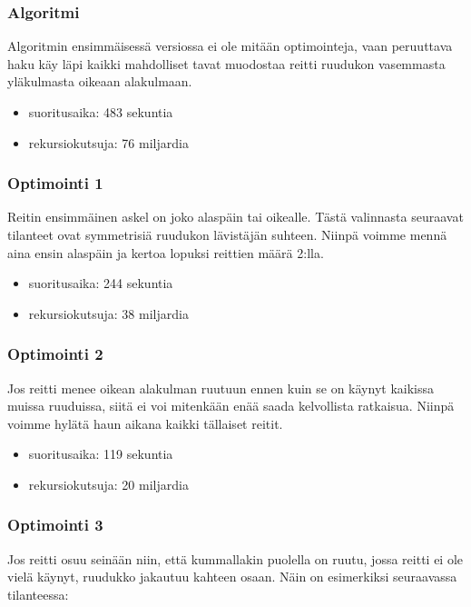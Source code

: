 \subsubsection{Algoritmi}

Algoritmin ensimmäisessä versiossa ei ole mitään optimointeja,
vaan peruuttava haku käy läpi kaikki mahdolliset tavat
muodostaa reitti ruudukon vasemmasta yläkulmasta
oikeaan alakulmaan.

\begin{itemize}
\item
suoritusaika: 483 sekuntia
\item
rekursiokutsuja: 76 miljardia
\end{itemize}

\subsubsection{Optimointi 1}

Reitin ensimmäinen askel on joko alaspäin
tai oikealle. Tästä valinnasta seuraavat tilanteet
ovat symmetrisiä ruudukon lävistäjän suhteen.
Niinpä voimme mennä aina ensin alaspäin
ja kertoa lopuksi reittien määrä 2:lla.

\begin{itemize}
\item
suoritusaika: 244 sekuntia
\item
rekursiokutsuja: 38 miljardia
\end{itemize}

\subsubsection{Optimointi 2}

Jos reitti menee oikean alakulman ruutuun ennen kuin
se on käynyt kaikissa muissa ruuduissa,
siitä ei voi mitenkään enää saada kelvollista ratkaisua.
Niinpä voimme hylätä haun aikana kaikki tällaiset reitit.

\begin{itemize}
\item
suoritusaika: 119 sekuntia
\item
rekursiokutsuja: 20 miljardia
\end{itemize}

\subsubsection{Optimointi 3}

Jos reitti osuu seinään niin, että kummallakin puolella
on ruutu, jossa reitti ei ole vielä käynyt,
ruudukko jakautuu kahteen osaan.
Näin on esimerkiksi seuraavassa tilanteessa:

